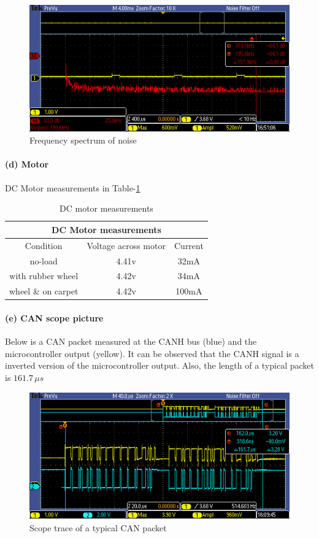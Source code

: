 \documentclass[a4paper]{article}
\newlength{\pic}
\begin{document}
\setlength{\pic}{0.8\textwidth}
\begin{figure}[htp]
\center
\includegraphics[width=\pic]{scope/ir_fft}
\caption{Frequency spectrum of noise}
\label{noise}
\end{figure}


\paragraph{(d) Motor} DC Motor measurements in Table-\ref{tab3}
\begin{table}
\center
  \begin{tabular}{|c|c|c|}
    \hline
    \multicolumn{3}{|c|}{DC Motor measurements} \\
    \hline
    Condition & Voltage across motor & Current \\
    \hline
	no-load				&	4.41v &	32mA \\
	with rubber wheel	&	4.42v &	34mA \\
	wheel \& on carpet	&   4.42v & 100mA \\
    \hline
  \end{tabular}
  \caption{DC motor measurements}
  \label{tab3}
\end{table}


\paragraph{(e) CAN scope picture} Below is a CAN packet measured at the CANH bus (blue) and the microcontroller output (yellow). It can be observed that the CANH signal is a inverted version of the microcontroller output. Also, the length of
a typical packet is $ 161.7 \, \mu s $

\setlength{\pic}{0.8\textwidth}
\begin{figure}[htp]
\center
\includegraphics[width=\pic]{scope/CAN_packet}
\caption{Scope trace of a typical CAN packet}
\label{trace}
\end{figure}
\end{document}
